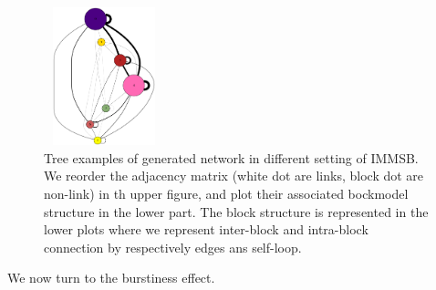 \begin{figure}[h]
	\endminipage
	\includegraphics[width=3.5cm, height=4cm]{img/M_g_regular/graph_dot}
	\endminipage
	\caption{Tree examples of generated network in different setting of IMMSB. We reorder the adjacency matrix (white dot are links, block dot are non-link) in th upper figure, and plot their associated bockmodel structure in the lower part. The block structure is represented in the lower plots where we represent inter-block and intra-block connection by respectively edges ans self-loop.  }
	\label{fig:gen_blocks}
\end{figure}


 We now turn to the burstiness effect.
